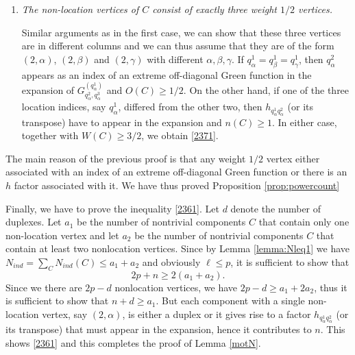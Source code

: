 \documentclass[draft]{article}
\newcommand{\al}{\alpha}
\newcommand{\qed}{\hfill\fbox{}\par\vspace{0.3mm}}
\numberwithin{equation}{section}
\numberwithin{theorem}{section}
\numberwithin{definition}{section}
\numberwithin{remark}{section}
\begin{document}
\begin{description}
\begin{enumerate}
\item {\it The non-location vertices of $C$ consist  of exactly three weight $1/2$ vertices.}

 
Similar arguments as in the first case, we can show that these three
vertices are in different columns and we can thus assume that they
 are of the form $(2,\al)$, $(2, \beta)$ and $(2,\gamma)$
with different $\al, \beta,\gamma$. If $q_\al^1=q_\beta^1=q_\gamma^1$, then
 $q^2_\al$  appears  as an index of an extreme  off-diagonal Green function
in the expansion of $G^{(q^1_\al)}_{q^2_\al, q^3_\al}$ and $O(C)\ge 1/2$. On the other hand,
if one of the three location indices, say $q_\al^1$, differed from the other
two, then $h_ {q^1_\alpha  q^2_\alpha}$  (or its transpose) have to appear in 
the expansion and $n(C)\ge 1$. In either case, together with $W(C)\ge 3/2$,
we obtain  \eqref{2371}.





\end{enumerate} 

 \end{description} 

The main reason of the previous proof is that any weight $1/2$
 vertex either associated with an index of an extreme 
 off-diagonal Green function or there is an $h$ factor associated with it. 
We have thus proved Proposition \ref{prop:powercount} \qed
\bigskip

Finally, we have to prove the inequality \eqref{2361}. 
Let $d$ denote the number of duplexes.
 Let
$a_1$ be the number of nontrivial components $C$ 
that contain only one non-location vertex
and let $a_2$ be the number of nontrivial components $C$ that contain
at least two nonlocation vertices. 
Since by Lemma \ref{lemma:Nleq1} we have 
 $N_{ind} = \sum_{C} N_{ind}(C) \le a_1+a_2$ 
and obviously $\ell \le  p$, it is sufficient
to show that 
$$ 
   2p + n \ge  2(a_1+a_2) .
$$
Since we there are  $2p-d$ nonlocation vertices, we have
$2p -d \ge a_1 + 2a_2$, thus it is sufficient to show that
$n+d\ge a_1$. But each component with a single non-location vertex,
say $(2, \al)$, is either a duplex
or it gives rise to a factor $h_{q_\al^1 q_\al^2}$ (or its
transpose) that must appear in the expansion, hence it
contributes to $n$. This shows  \eqref{2361}
and this completes the proof of Lemma \ref{motN}. \qed





   
\end{document}
